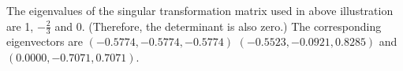 \documentclass{scrartcl}
\begin{document}
The eigenvalues of the singular transformation matrix used in above illustration are 1, $-\frac{2}{3}$ and 0. (Therefore, the determinant is also zero.) The corresponding eigenvectors are $(-0.5774, -0.5774, -0.5774)$  $(-0.5523, -0.0921, 0.8285)$ and $(0.0000, -0.7071, 0.7071)$.

%
%
\end{document}

